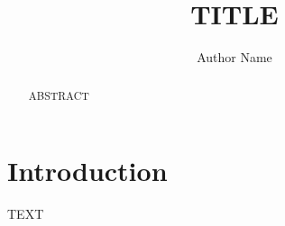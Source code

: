 \documentclass[runningheads]{llncs}
\begin{document}
\title{TITLE}
\author{Author Name}
\maketitle
\begin{abstract}
ABSTRACT 
\end{abstract}

\section{Introduction}
TEXT



\end{document}
